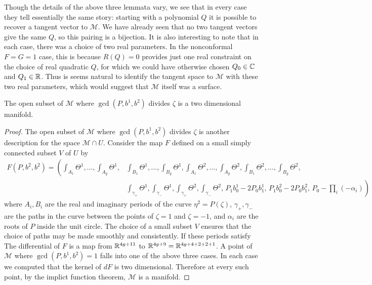 Though the details of the above three lemmata vary, we see that in every case they tell essentially the same story: starting with a polynomial $Q$ it is possible to recover a tangent vector to $\mathcal{M}$. We have already seen that no two tangent vectors give the same $Q$, so this pairing is a bijection. It is also interesting to note that in each case, there was a choice of two real parameters. In the nonconformal $F=G=1$ case, this is because $R(Q) = 0$ provides just one real constraint on the choice of real quadratic $Q$, for which we could have otherwise chosen $Q_0 \in \mathbb{C}$ and $Q_1\in \mathbb{R}$. Thus is seems natural to identify the tangent space to $\mathcal{M}$ with these two real parameters, which would suggest that $\mathcal{M}$ itself was a surface.

\begin{thm}
The open subset of $\mathcal{M}$ where $\gcd(P,b^1,b^2)$ divides $ζ$ is a two dimensional manifold.

\begin{proof}
The open subset of $\mathcal{M}$ where $\gcd(P,b^1,b^2)$ divides $ζ$ is another description for the space $\mathcal{M}\cap U$. Consider the map $F$ defined on a small simply connected subset $V$ of $U$ by
\begin{align*}
F(P,b^2,b^2)
= \left( \int_{A_1} Θ^1, \dots, \int_{A_g} Θ^1, \right.& \int_{B_1} Θ^1, \dots, \int_{B_g} Θ^1, \int_{A_1} Θ^2, \dots, \int_{A_g} Θ^2, \int_{B_1} Θ^2, \dots, \int_{B_g} Θ^2, \\
&\left. \int_{γ_+} Θ^1, \int_{γ_-} Θ^1, \int_{γ_+} Θ^2, \int_{γ_-} Θ^2,\, P_1b^1_0 - 2P_0b^1_1,\, P_1b^2_0 - 2P_0b^2_1,\, P_0 - \prod_{i}(-α_i) \right)
\end{align*}
where $A_i, B_i$ are the real and imaginary periods of the curve $η^2 = P(ζ)$, $γ_+,γ_-$ are the paths in the curve between the points of $ζ=1$ and $ζ=-1$, and $α_i$ are the roots of $P$ inside the unit circle. The choice of a small subset $V$ ensures that the choice of paths may be made smoothly and consistently. If these periods satisfy $ $The differential of $F$ is a map from $\mathbb{R}^{4g+11}$ to $\mathbb{R}^{4g+9} = \mathbb{R}^{4g+4+2+2+1}$. A point of $\mathcal{M}$ where $\gcd(P,b^1,b^2) = 1$ falls into one of the above three cases. In each case we computed that the kernel of $dF$ is two dimensional. Therefore at every such point, by the implict function theorem, $\mathcal{M}$ is a manifold.
\end{proof}
\end{thm}

